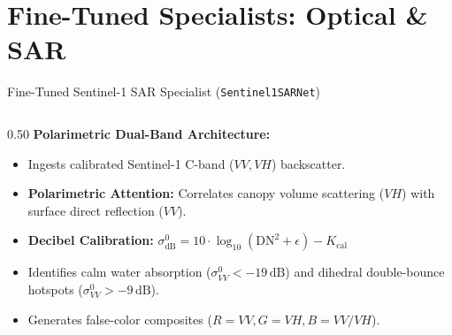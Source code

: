 \documentclass[aspectratio=169, 10pt]{beamer}
\begin{document}
\section{Fine-Tuned Specialists: Optical \& SAR}

\begin{frame}{Fine-Tuned Sentinel-1 SAR Specialist (\texttt{Sentinel1SARNet})}
  \vspace{-0.2em}
  \begin{columns}[T]
    \begin{column}{0.50\textwidth}
      \textbf{\color{IEEEDarkBlue}Polarimetric Dual-Band Architecture:}
      \begin{itemize}\setlength{\itemsep}{2.5pt}\small
        \item Ingests calibrated Sentinel-1 C-band ($VV, VH$) backscatter.
        \item \textbf{Polarimetric Attention:} Correlates canopy volume scattering ($VH$) with surface direct reflection ($VV$).
        \item \textbf{Decibel Calibration:} $\sigma^0_{\text{dB}} = 10 \cdot \log_{10}(\text{DN}^2 + \epsilon) - K_{\text{cal}}$
        \item Identifies calm water absorption ($\sigma^0_{VV} < -19\,\text{dB}$) and dihedral double-bounce hotspots ($\sigma^0_{VV} > -9\,\text{dB}$).
        \item Generates false-color composites ($R=VV, G=VH, B=VV/VH$).
      \end{itemize}
    \end{column}


\end{columns}
\end{frame}
\end{document}
